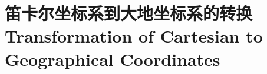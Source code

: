 \section[笛卡尔坐标系到大地坐标系的转换]{笛卡尔坐标系到大地坐标系的转换\\Transformation of Cartesian to Geographical Coordinates}
